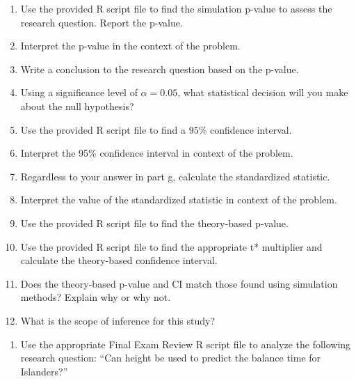 \documentclass[
]{report}
\providecommand{\tightlist}{%
  \setlength{\itemsep}{0pt}\setlength{\parskip}{0pt}}
\begin{document}
\vspace{0.8in}

\begin{enumerate}
\def\labelenumi{\alph{enumi}.}
\setcounter{enumi}{7}
\item
  Use the provided R script file to find the simulation p-value to assess the research question. Report the p-value.
  \vspace{0.3in}
\item
  Interpret the p-value in the context of the problem.
  \vspace{0.8in}
\item
  Write a conclusion to the research question based on the p-value.
  \vspace{0.8in}
\item
  Using a significance level of \(\alpha = 0.05\), what statistical decision will you make about the null hypothesis?
  \vspace{0.3in}
\item
  Use the provided R script file to find a 95\% confidence interval.
  \vspace{0.3in}
\item
  Interpret the 95\% confidence interval in context of the problem.
  \vspace{0.8in}
\item
  Regardless to your answer in part g, calculate the standardized statistic.
  \vspace{0.4in}
\item
  Interpret the value of the standardized statistic in context of the problem.
  \vspace{0.8in}
\item
  Use the provided R script file to find the theory-based p-value.
  \vspace{0.3in}
\item
  Use the provided R script file to find the appropriate t* multiplier and calculate the theory-based confidence interval.
  \vspace{0.5in}
\item
  Does the theory-based p-value and CI match those found using simulation methods? Explain why or why not.
  \vspace{0.8in}
\item
  What is the scope of inference for this study?
  \vspace{0.8in}
\end{enumerate}

\begin{enumerate}
\def\labelenumi{\arabic{enumi}.}
\setcounter{enumi}{2}
\tightlist
\item
  Use the appropriate Final Exam Review R script file to analyze the following research question: ``Can height be used to predict the balance time for Islanders?''
\end{enumerate}
\end{document}
